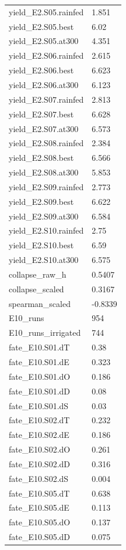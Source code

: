 {\begin{longtable}{p{}p{}}
{}yield\_E2.S05.rainfed & 1.851\\
{}yield\_E2.S05.best & 6.02\\
{}yield\_E2.S05.at300 & 4.351\\
{}yield\_E2.S06.rainfed & 2.615\\
{}yield\_E2.S06.best & 6.623\\
{}yield\_E2.S06.at300 & 6.123\\
{}yield\_E2.S07.rainfed & 2.813\\
{}yield\_E2.S07.best & 6.628\\
{}yield\_E2.S07.at300 & 6.573\\
{}yield\_E2.S08.rainfed & 2.384\\
{}yield\_E2.S08.best & 6.566\\
{}yield\_E2.S08.at300 & 5.853\\
{}yield\_E2.S09.rainfed & 2.773\\
{}yield\_E2.S09.best & 6.622\\
{}yield\_E2.S09.at300 & 6.584\\
{}yield\_E2.S10.rainfed & 2.75\\
{}yield\_E2.S10.best & 6.59\\
{}yield\_E2.S10.at300 & 6.575\\
{}collapse\_raw\_h & 0.5407\\
{}collapse\_scaled & 0.3167\\
{}spearman\_scaled & -0.8339\\
{}E10\_runs & 954\\
{}E10\_runs\_irrigated & 744\\
{}fate\_E10.S01.dT & 0.38\\
{}fate\_E10.S01.dE & 0.323\\
{}fate\_E10.S01.dO & 0.186\\
{}fate\_E10.S01.dD & 0.08\\
{}fate\_E10.S01.dS & 0.03\\
{}fate\_E10.S02.dT & 0.232\\
{}fate\_E10.S02.dE & 0.186\\
{}fate\_E10.S02.dO & 0.261\\
{}fate\_E10.S02.dD & 0.316\\
{}fate\_E10.S02.dS & 0.004\\
{}fate\_E10.S05.dT & 0.638\\
{}fate\_E10.S05.dE & 0.113\\
{}fate\_E10.S05.dO & 0.137\\
{}fate\_E10.S05.dD & 0.075\\

\end{longtable}}
